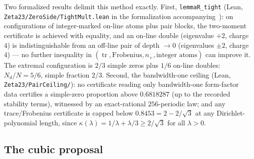\documentclass[11pt]{article}
\theoremstyle{plain}
\theoremstyle{definition}
\theoremstyle{remark}
\newcommand{\tr}{\operatorname{tr}}
\newcommand{\Nd}{N_{d}}
\begin{document}
Two formalized results delimit this method exactly. First,
\texttt{lemmaR\_tight} (Lean,
\texttt{Zeta23/}\allowbreak\texttt{ZeroSide/}\allowbreak\texttt{TightMult.lean}
in the formalization accompanying~\cite{AF26}): on
configurations of integer-marked on-line atoms plus pair blocks, the two-moment
certificate is achieved with equality, and an on-line double (eigenvalue $+2$,
charge $4$) is indistinguishable from an off-line pair of depth $\to 0$
(eigenvalues $\pm 2$, charge $4$) --- no further inequality in
$(\tr, \text{Frobenius}, n_+, \text{integer atoms})$ can improve it. The
extremal configuration is $2/3$ simple zeros plus $1/6$ on-line doubles:
$\Nd/N = 5/6$, simple fraction $2/3$. Second, the bandwidth-one ceiling (Lean,
\texttt{Zeta23/PairCeiling/}): no certificate reading only bandwidth-one
form-factor data certifies a simple-zero proportion above $0.6818287$ (up to the
recorded stability terms), witnessed by an exact-rational $256$-periodic law; and
any trace/Frobenius certificate is capped below $0.8453 = 2 - 2/\sqrt{3}$ at any
Dirichlet-polynomial length, since $\kappa(\lambda) = 1/\lambda + \lambda/3 \ge
2/\sqrt{3}$ for all $\lambda > 0$.

\subsection{The cubic proposal}
\end{document}

